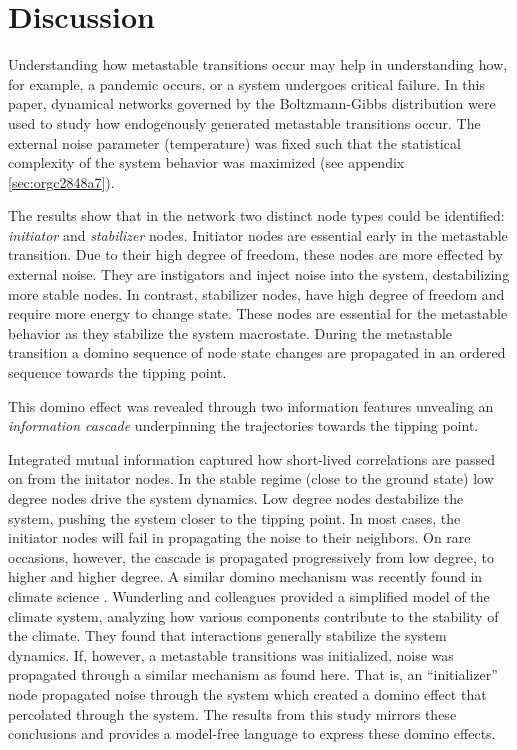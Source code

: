 \documentclass[a4paper, 11pt, twocolumn]{article}
\begin{document}
\section{Discussion}
\label{sec:org389dbab}
Understanding how  metastable transitions occur may  help in
understanding  how, for  example,  a pandemic  occurs, or  a
system undergoes critical failure.  In this paper, dynamical
networks governed  by the Boltzmann-Gibbs  distribution were
used   to  study   how  endogenously   generated  metastable
transitions    occur.   The    external   noise    parameter
(temperature) was fixed such that the statistical complexity
of  the  system behavior  was  maximized  (see appendix \ref{sec:orgc2848a7}).

The results show that in the network two distinct node types
could  be identified:  \emph{initiator}  and \emph{stabilizer}  nodes.
Initiator  nodes  are  essential  early  in  the  metastable
transition. Due to their high degree of freedom, these nodes
are more  effected by  external noise. They  are instigators
and inject noise into  the system, destabilizing more stable
nodes. In  contrast, stabilizer  nodes, have high  degree of
freedom and require more energy to change state. These nodes
are essential for the  metastable behavior as they stabilize
the system  macrostate. During  the metastable  transition a
domino sequence of  node state changes are  propagated in an
ordered sequence towards the tipping point.

This  domino effect  was  revealed  through two  information
features unvealing an \emph{information cascade} underpinning the
trajectories towards the tipping point.

Integrated  mutual  information   captured  how  short-lived
correlations are passed  on from the initator  nodes. In the
stable regime (close  to the ground state)  low degree nodes
drive the system dynamics.  Low degree nodes destabilize the
system, pushing the  system closer to the  tipping point. In
most cases, the initiator nodes will fail in propagating the
noise to  their neighbors.  On rare occasions,  however, the
cascade  is propagated  progressively  from  low degree,  to
higher  and higher  degree. A  similar domino  mechanism was
recently        found        in       climate        science
\cite{Wunderling2020,Wunderling2021}.      Wunderling      and
colleagues  provided  a  simplified  model  of  the  climate
system, analyzing  how various components contribute  to the
stability  of  the  climate. They  found  that  interactions
generally  stabilize the  system  dynamics.  If, however,  a
metastable transitions was initialized, noise was propagated
through  a similar  mechanism  as found  here.  That is,  an
``initializer'' node propagated noise through the system which
created a domino effect  that percolated through the system.
The results  from this  study mirrors these  conclusions and
provides  a  model-free  language to  express  these  domino
effects.
\end{document}
